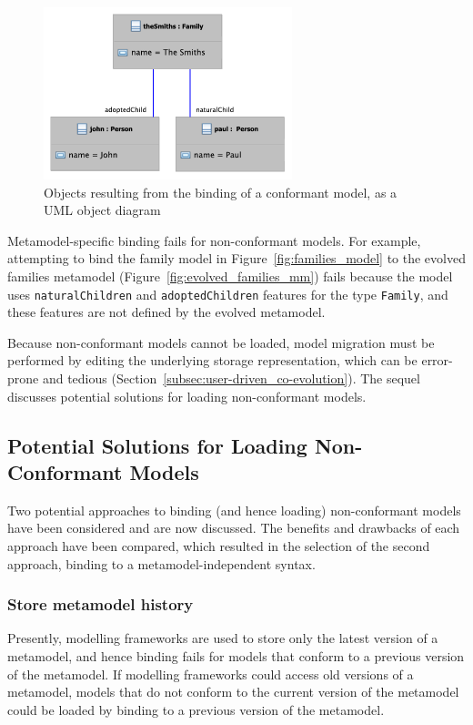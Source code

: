 \begin{figure}[htbp]
  \centering
  \includegraphics[height=5cm]{5.Implementation/images/successful_binding.pdf}
  \caption[Objects resulting from the binding of a conformant model]{Objects resulting from the binding of a conformant model, as a UML object diagram}
  \label{fig:successful_binding}
\end{figure}

Metamodel-specific binding fails for non-conformant models. For example, attempting to bind the family model in Figure~\ref{fig:families_model} to the evolved families metamodel (Figure~\ref{fig:evolved_families_mm}) fails because the model uses \texttt{na\-tu\-r\-alCh\-il\-dr\-en} and \texttt{ad\-op\-t\-edCh\-il\-dr\-en} features for the type \texttt{Fa\-mi\-ly}, and these features are not defined by the evolved metamodel.

Because non-conformant models cannot be loaded, model migration must be performed by editing the underlying storage representation, which can be error-prone and tedious (Section~\ref{subsec:user-driven_co-evolution}). The sequel discusses potential solutions for loading non-conformant models.

\subsection{Potential Solutions for Loading Non-Conformant Models}
Two potential approaches to binding (and hence loading) non-conformant models have been considered and are now discussed. The benefits and drawbacks of each approach have been compared, which resulted in the selection of the second approach, binding to a metamodel-independent syntax.

\subsubsection{Store metamodel history}
Presently, modelling frameworks are used to store only the latest version of a metamodel, and hence binding fails for models that conform to a previous version of the metamodel. If modelling frameworks could access old versions of a metamodel, models that do not conform to the current version of the metamodel could be loaded by binding to a previous version of the metamodel.

